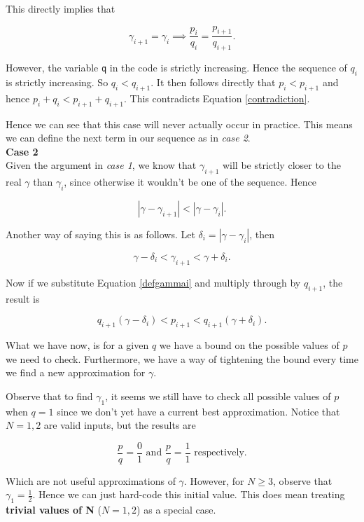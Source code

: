 \documentclass[10pt]{article}
\newcommand*{\gam}{$\gamma$}
\newcommand*{\gami}{$\gamma_{i}$}
\begin{document}
This directly implies that

$$ \gamma_{i+1} = \gamma_{i}  \implies \frac{p_i}{q_i} = \frac{p_{i+1}}{q_{i+1}}.$$

However, the variable \texttt{q} in the code is strictly increasing. Hence the sequence of $q_i$ is strictly increasing. So $q_i < q_{i+1}$. It then follows directly that $p_i < p_{i+1}$ and hence $p_i + q_i < p_{i+1} + q_{i+1}$. This contradicts Equation \ref{contradiction}.

Hence we can see that this case will never actually occur in practice. This means we can define the next term in our sequence as in \emph{case 2}. \\

\noindent \textbf{Case 2} \\

Given the argument in \emph{case 1}, we know that $\gamma_{i+1}$ will be strictly closer to the real $\gamma$ than \gami, since otherwise it wouldn't be one of the sequence. Hence

$$ |\gamma- \gamma_{i+1}| < |\gamma - \gamma_{i}| .$$

Another way of saying this is as follows. Let $\delta_{i} = | \gamma - \gamma_i  |$, then

$$ \gamma - \delta_i < \gamma_{i+1} < \gamma + \delta_i .$$

Now if we substitute Equation \ref{defgammai} and multiply through by $q_{i+1}$, the result is

\begin{equation} \label{em_constraint}
q_{i+1} (\gamma - \delta_i) < p_{i+1} < q_{i+1} ( \gamma + \delta_i ).
\end{equation} 

What we have now, is for a given $q$ we have a bound on the possible values of $p$ we need to check. Furthermore, we have a way of tightening the bound every time we find a new approximation for \gam.

Observe that to find $\gamma_1$, it seems we still have to check all possible values of $p$ when $q = 1$ since we don't yet have a current best approximation. Notice that $N = 1,2$ are valid inputs, but the results are

$$ \frac{p}{q} = \frac{0}{1} \text{  and  }  \frac{p}{q} = \frac{1}{ 1} \text{ respectively}. $$

Which are not useful approximations of \gam.
 However, for $N \geq 3$, observe that $\gamma_1 = \frac{1}{2}$. Hence we can just hard-code this initial value. This does mean treating \textbf{trivial values of N} ($N = 1,2$) as a special case.
\end{document}
